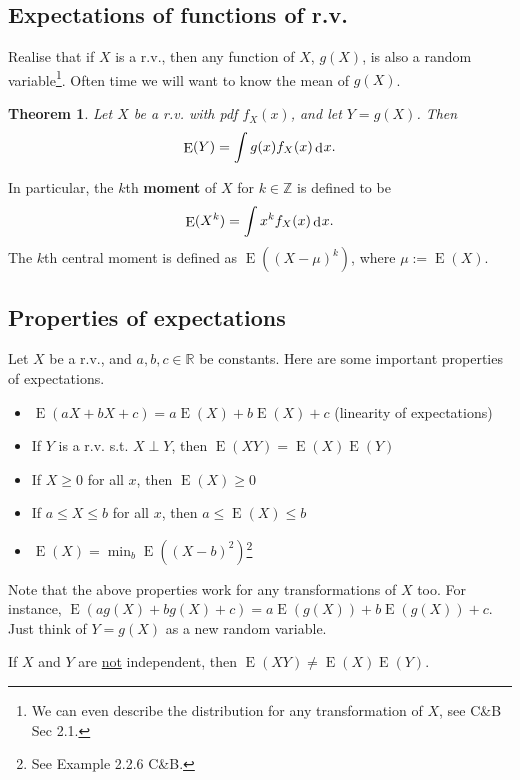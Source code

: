 \documentclass[
]{book}
\providecommand{\tightlist}{%
  \setlength{\itemsep}{0pt}\setlength{\parskip}{0pt}}
\DeclareMathOperator{\E}{E}
\newcommand{\bbR}{\mathbb{R}}
\newcommand{\bbZ}{\mathbb{Z}}
\DeclareMathOperator{\dd}{d}
\newcommand{\dint}{\dd\hspace{0.5pt}\!}
\newtheorem{theorem}{Theorem}[chapter]
\theoremstyle{definition}
\theoremstyle{definition}
\theoremstyle{definition}
\theoremstyle{definition}
\theoremstyle{remark}
\begin{document}
\hypertarget{expectations-of-functions-of-r.v.}{%
\subsection{Expectations of functions of r.v.}\label{expectations-of-functions-of-r.v.}}

Realise that if \(X\) is a r.v., then any function of \(X\), \(g(X)\), is also a random variable\footnote{We can even describe the distribution for any transformation of \(X\), see C\&B Sec 2.1.}.
Often time we will want to know the mean of \(g(X)\).

\begin{theorem}
Let \(X\) be a r.v. with pdf \(f_X(x)\), and let \(Y=g(X)\). Then
\[
\E(Y) = \int g(x)f_X(x)\dint x.
\]
\end{theorem}

In particular, the \(k\)th \textbf{moment} of \(X\) for \(k\in\bbZ\) is defined to be
\[
\E(X^k) = \int x^kf_X(x)\dint x.
\]
The \(k\)th central moment is defined as \(\E((X-\mu)^k)\), where \(\mu:=\E(X)\).

\hypertarget{properties-of-expectations}{%
\subsection{Properties of expectations}\label{properties-of-expectations}}

Let \(X\) be a r.v., and \(a,b,c\in\bbR\) be constants.
Here are some important properties of expectations.

\begin{itemize}
\tightlist
\item
  \(\E(aX +bX +c) = a\E(X) + b\E(X) + c\) (linearity of expectations)
\item
  If \(Y\) is a r.v. s.t. \(X\perp Y\), then \(\E(XY) = \E(X)\E(Y)\)
\item
  If \(X\geq 0\) for all \(x\), then \(\E(X)\geq 0\)
\item
  If \(a \leq X \leq b\) for all \(x\), then \(a \leq \E(X) \leq b\)
\item
  \(\E(X) = \min_b \E((X-b)^2)\)\footnote{See Example 2.2.6 C\&B.}
\end{itemize}

Note that the above properties work for any transformations of \(X\) too.
For instance, \(\E(ag(X) +bg(X) +c) = a\E(g(X)) + b\E(g(X)) + c\). Just think of \(Y=g(X)\) as a new random variable.

If \(X\) and \(Y\) are \uline{not} independent, then \(\E(XY) \neq \E(X)\E(Y)\).
\end{document}
